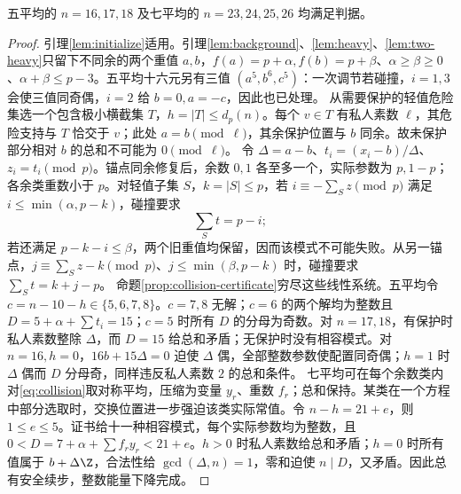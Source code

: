 \begin{lemma}\label{lem:collision-small}
五平均的 $n=16,17,18$ 及七平均的 $n=23,24,25,26$ 均满足判据。
\end{lemma}
\begin{proof}
引理\ref{lem:initialize}适用。引理\ref{lem:background}、\ref{lem:heavy}、\ref{lem:two-heavy}只留下不同余的两个重值 $a,b$，$f(a)=p+\alpha,f(b)=p+\beta$、$\alpha\ge\beta\ge0$、$\alpha+\beta\le p-3$。五平均十六元另有三值 $(a^5,b^6,c^5)$：一次调节若碰撞，$i=1,3$ 会使三值同奇偶，$i=2$ 给 $b=0,a=-c$，因此也已处理。
从需要保护的轻值危险集选一个包含极小横截集 $T$，$h=|T|\le d_p(n)$。每个 $v\in T$ 有私人素数 $\ell$，其危险支持与 $T$ 恰交于 $v$；此处 $a=b\pmod\ell$，其余保护位置与 $b$ 同余。故未保护部分相对 $b$ 的总和不可能为 $0\pmod\ell$。
令 $\Delta=a-b$、$t_i=(x_i-b)/\Delta$、$z_i=t_i\pmod p$。锚点同余修复后，余数 $0,1$ 各至多一个，实际参数为 $p,1-p$；各余类重数小于 $p$。对轻值子集 $S$，$k=|S|\le p$，若 $i\equiv-\sum_{S}z\pmod p$ 满足 $i\le\min(\alpha,p-k)$，碰撞要求
\begin{equation}\label{eq:collision}
\sum_{S}t=p-i;
\end{equation}
若还满足 $p-k-i\le\beta$，两个旧重值均保留，因而该模式不可能失败。从另一锚点，$j\equiv\sum_S z-k\pmod p$、$j\le\min(\beta,p-k)$ 时，碰撞要求 $\sum_S t=k+j-p$。
命题\ref{prop:collision-certificate}穷尽这些线性系统。五平均令 $c=n-10-h\in\{5,6,7,8\}$。$c=7,8$ 无解；$c=6$ 的两个解均为整数且 $D=5+\alpha+\sum t_i=15$；$c=5$ 时所有 $D$ 的分母为奇数。对 $n=17,18$，有保护时私人素数整除 $\Delta$，而 $D=15$ 给总和矛盾；无保护时没有相容模式。对 $n=16,h=0$，$16b+15\Delta=0$ 迫使 $\Delta$ 偶，全部整数参数使配置同奇偶；$h=1$ 时 $\Delta$ 偶而 $D$ 分母奇，同样违反私人素数 $2$ 的总和条件。
七平均可在每个余数类内对\eqref{eq:collision}取对称平均，压缩为变量 $y_r$、重数 $f_r$；总和保持。某类在一个方程中部分选取时，交换位置进一步强迫该类实际常值。令 $n-h=21+e$，则 $1\le e\le5$。证书给十一种相容模式，每个实际参数均为整数，且 $0<D=7+\alpha+\sum f_ry_r<21+e$。$h>0$ 时私人素数给总和矛盾；$h=0$ 时所有值属于 $b+\Delta\Z$，合法性给 $\gcd(\Delta,n)=1$，零和迫使 $n\mid D$，又矛盾。因此总有安全续步，整数能量下降完成。
\end{proof}

